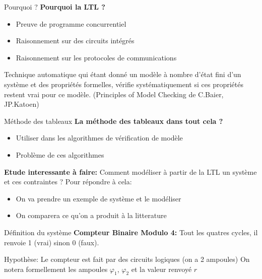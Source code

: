 \documentclass{beamer}
\begin{document}
\begin{frame}{Pourquoi ?}
    \textbf{Pourquoi la LTL ?}
    \begin{itemize}
        \item Preuve de programme concurrentiel
        \item Raisonnement sur des circuits intégrés
        \item Raisonnement sur les protocoles de communications
    \end{itemize}
    \pause
    \begin{definition}
    Technique automatique qui étant donné un modèle à nombre d'état fini d'un système et des propriétés formelles,
    vérifie systématiquement si ces propriétés restent vrai pour ce modèle. (Principles of Model Checking de C.Baier, JP.Katoen)
    \end{definition}
\end{frame}

\begin{frame}{Méthode des tableaux}
    \textbf{La méthode des tableaux dans tout cela ?}
    \begin{itemize}
        \item Utiliser dans les algorithmes de vérification de modèle
        \item Problème de ces algorithmes
    \end{itemize}
    \pause
    \vspace{10px}
    \textbf{Etude interessante à faire:}
    Comment modéliser à partir de la LTL un système et ces contraintes ?
    \pause
    Pour répondre à cela:
    \begin{itemize}
        \item On va prendre un exemple de système et le modéliser
        \item On comparera ce qu'on a produit à la litterature
    \end{itemize}
\end{frame}

\begin{frame}{Définition du système}
    \textbf{Compteur Binaire Modulo 4: } Tout les quatres cycles, il renvoie 1 (vrai) sinon 0 (faux).
    \vspace{10px}

    \pause
    Hypothèse: Le compteur est fait par des circuits logiques (on a 2 ampoules)
    On notera formellement les ampoules $\varphi_1$, $\varphi_2$ et la valeur renvoyé $r$
\end{frame}
\end{document}
